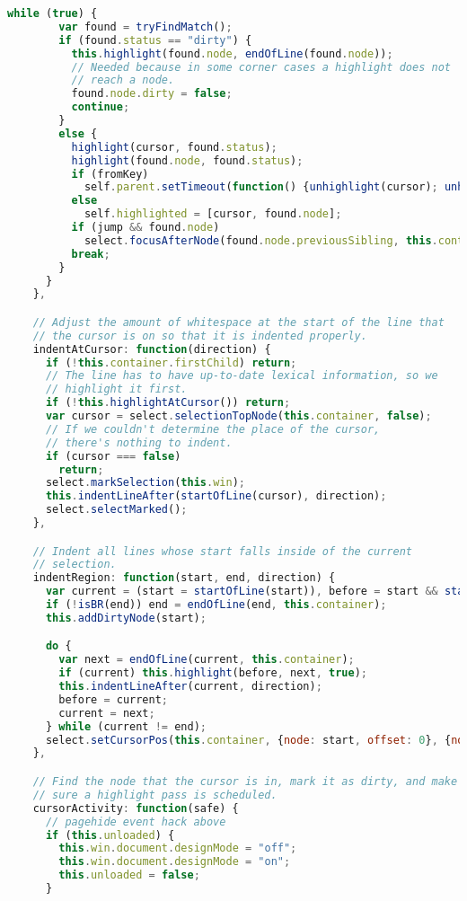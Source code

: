 \begin{lstlisting}[language=Javascript]
      while (true) {
        var found = tryFindMatch();
        if (found.status == "dirty") {
          this.highlight(found.node, endOfLine(found.node));
          // Needed because in some corner cases a highlight does not
          // reach a node.
          found.node.dirty = false;
          continue;
        }
        else {
          highlight(cursor, found.status);
          highlight(found.node, found.status);
          if (fromKey)
            self.parent.setTimeout(function() {unhighlight(cursor); unhighlight(found.node);}, 500);
          else
            self.highlighted = [cursor, found.node];
          if (jump && found.node)
            select.focusAfterNode(found.node.previousSibling, this.container);
          break;
        }
      }
    },

    // Adjust the amount of whitespace at the start of the line that
    // the cursor is on so that it is indented properly.
    indentAtCursor: function(direction) {
      if (!this.container.firstChild) return;
      // The line has to have up-to-date lexical information, so we
      // highlight it first.
      if (!this.highlightAtCursor()) return;
      var cursor = select.selectionTopNode(this.container, false);
      // If we couldn't determine the place of the cursor,
      // there's nothing to indent.
      if (cursor === false)
        return;
      select.markSelection(this.win);
      this.indentLineAfter(startOfLine(cursor), direction);
      select.selectMarked();
    },

    // Indent all lines whose start falls inside of the current
    // selection.
    indentRegion: function(start, end, direction) {
      var current = (start = startOfLine(start)), before = start && startOfLine(start.previousSibling);
      if (!isBR(end)) end = endOfLine(end, this.container);
      this.addDirtyNode(start);

      do {
        var next = endOfLine(current, this.container);
        if (current) this.highlight(before, next, true);
        this.indentLineAfter(current, direction);
        before = current;
        current = next;
      } while (current != end);
      select.setCursorPos(this.container, {node: start, offset: 0}, {node: end, offset: 0});
    },

    // Find the node that the cursor is in, mark it as dirty, and make
    // sure a highlight pass is scheduled.
    cursorActivity: function(safe) {
      // pagehide event hack above
      if (this.unloaded) {
        this.win.document.designMode = "off";
        this.win.document.designMode = "on";
        this.unloaded = false;
      }


\end{lstlisting}
